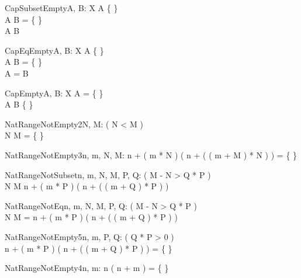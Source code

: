 \begin{theorem}{CapSubsetEmpty}{A, B: \power X}
A \neq \{ \} \\
A \cap B = \{ \} \\
A \subset B
\end{theorem}

\begin{theorem}{CapEqEmpty}{A, B: \power X}
A \neq \{ \} \\
A \cap B = \{ \} \\
A = B
\end{theorem}

\begin{theorem}{CapEmpty}{A, B: \power X}
A = \{ \} \\
A \cap B \neq \{ \}
\end{theorem}

\begin{theorem}{NatRangeNotEmpty2}{\const N, \const M: \nat}
\eval( N < M ) \\
N \upto M = \{ \}
\end{theorem}

\begin{theorem}{NatRangeNotEmpty3}{n, m, \const N, \const M: \nat}
n + ( m * N ) \upto ( n + ( ( m + M ) * N ) ) = \{ \}
\end{theorem}

\begin{theorem}{NatRangeNotSubset}{n, m, \const N, \const M, \const P, \const Q: \nat}
\eval( M - N > Q * P ) \\
N \upto M \subset n + ( m * P ) \upto ( n + ( ( m + Q ) * P ) )
\end{theorem}

\begin{theorem}{NatRangeNotEq}{n, m, \const N, \const M, \const P, \const Q: \nat}
\eval( M - N > Q * P ) \\
N \upto M = n + ( m * P ) \upto ( n + ( ( m + Q ) * P ) )
\end{theorem}

\begin{theorem}{NatRangeNotEmpty5}{n, m, \const P, \const Q: \nat}
\eval( Q * P > 0 ) \\
n + ( m * P ) \upto ( n + ( ( m + Q ) * P ) ) = \{ \}
\end{theorem}

\begin{theorem}{NatRangeNotEmpty4}{n, m: \nat}
n \upto ( n + m ) = \{ \}
\end{theorem}

